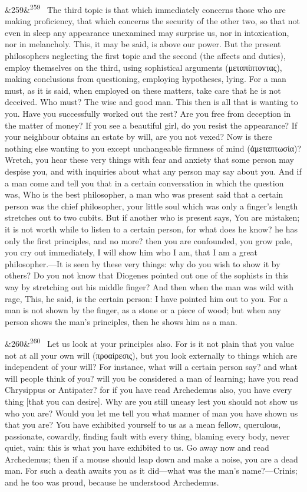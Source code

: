 \documentclass[12pt]{article}
\newcommand{\para}[1][]{\par\noindent\ifx&#1&\else\textsuperscript{\footnotesize #1}~\fi}
\begin{document}
\para[259] The third topic is that which immediately concerns those who are making proficiency, that which concerns the security of the other two, so that not even in sleep any appearance unexamined may surprise us, nor in intoxication, nor in melancholy. This, it may be said, is above our power. But the present philosophers neglecting the first topic and the second (the affects and duties), employ themselves on the third, using sophistical arguments (μεταπίπτοντας), making conclusions from questioning, employing hypotheses, lying. For a man must, as it is said, when employed on these matters, take care that he is not deceived. Who must? The wise and good man. This then is all that is wanting to you. Have you successfully worked out the rest? Are you free from deception in the matter of money? If you see a beautiful girl, do you resist the appearance? If your neighbour obtains an estate by will, are you not vexed? Now is there nothing else wanting to you except unchangeable firmness of mind (ἀμεταπτωσία)? Wretch, you hear these very things with fear and anxiety that some person may despise you, and with inquiries about what any person may say about you. And if a man come and tell you that in a certain conversation in which the question was, Who is the best philosopher, a man who was present said that a certain person was the chief philosopher, your little soul which was only a finger's length stretches out to two cubits. But if another who is present says, You are mistaken; it is not worth while to listen to a certain person, for what does he know? he has only the first principles, and no more? then you are confounded, you grow pale, you cry out immediately, I will show him who I am, that I am a great philosopher.—It is seen by these very things: why do you wish to show it by others? Do you not know that Diogenes pointed out one of the sophists in this way by stretching out his middle finger? And then when the man was wild with rage, This, he said, is the certain person: I have pointed him out to you. For a man is not shown by the finger, as a stone or a piece of wood; but when any person shows the man's principles, then he shows him as a man.

\para[260] Let us look at your principles also. For is it not plain that you value not at all your own will (προαίρεσις), but you look externally to things which are independent of your will? For instance, what will a certain person say? and what will people think of you? will you be considered a man of learning; have you read Chrysippus or Antipater? for if you have read Archedemus also, you have every thing [that you can desire]. Why are you still uneasy lest you should not show us who you are? Would you let me tell you what manner of man you have shown us that you are? You have exhibited yourself to us as a mean fellow, querulous, passionate, cowardly, finding fault with every thing, blaming every body, never quiet, vain: this is what you have exhibited to us. Go away now and read Archedemus; then if a mouse should leap down and make a noise, you are a dead man. For such a death awaits you as it did—what was the man's name?—Crinis; and he too was proud, because he understood Archedemus.
\end{document}
